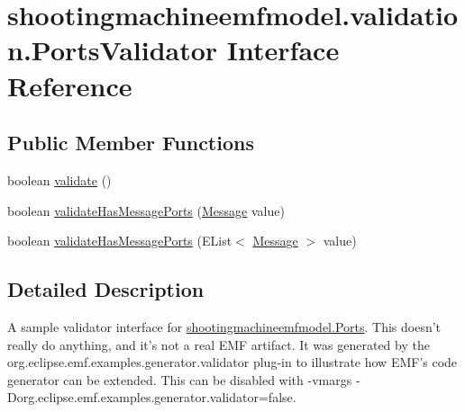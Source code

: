 \hypertarget{interfaceshootingmachineemfmodel_1_1validation_1_1_ports_validator}{\section{shootingmachineemfmodel.\-validation.\-Ports\-Validator Interface Reference}
\label{interfaceshootingmachineemfmodel_1_1validation_1_1_ports_validator}
}
\subsection*{Public Member Functions}
\begin{DoxyCompactItemize}
\item 
boolean \hyperlink{interfaceshootingmachineemfmodel_1_1validation_1_1_ports_validator_a4650a6d36c7ac6704b61f9e910791f23}{validate} ()
\item 
boolean \hyperlink{interfaceshootingmachineemfmodel_1_1validation_1_1_ports_validator_ae98316b2bda75ac9c25822972251cdee}{validate\-Has\-Message\-Ports} (\hyperlink{interfaceshootingmachineemfmodel_1_1_message}{Message} value)
\item 
boolean \hyperlink{interfaceshootingmachineemfmodel_1_1validation_1_1_ports_validator_a64d0efc8e8f1895e3d5bb382144dee22}{validate\-Has\-Message\-Ports} (E\-List$<$ \hyperlink{interfaceshootingmachineemfmodel_1_1_message}{Message} $>$ value)
\end{DoxyCompactItemize}


\subsection{Detailed Description}
A sample validator interface for \hyperlink{interfaceshootingmachineemfmodel_1_1_ports}{shootingmachineemfmodel.\-Ports}. This doesn't really do anything, and it's not a real E\-M\-F artifact. It was generated by the org.\-eclipse.\-emf.\-examples.\-generator.\-validator plug-\/in to illustrate how E\-M\-F's code generator can be extended. This can be disabled with -\/vmargs -\/\-Dorg.\-eclipse.\-emf.\-examples.\-generator.\-validator=false. 


